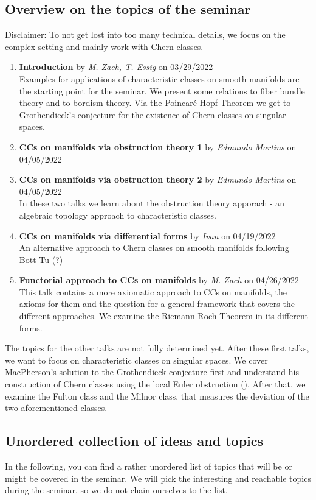 \documentclass[a4paper]{article}
\begin{document}
\subsection*{Overview on the topics of the seminar}
Disclaimer: To not get lost into too many technical details, we focus on the complex setting
and mainly work with Chern classes.

\begin{enumerate}
\item \textbf{Introduction} by \emph{M. Zach, T. Essig} on 03/29/2022 \\
	Examples for applications of characteristic classes on smooth manifolds are the
	starting point for the seminar. We present some relations to fiber bundle theory 
	and to bordism theory. Via the Poincar\'e-Hopf-Theorem we get to Grothendieck's 
	conjecture for the existence of Chern classes on singular spaces.
\item \textbf{CCs on manifolds via obstruction theory 1} by \emph{Edmundo Martins} on 04/05/2022
\item \textbf{CCs on manifolds via obstruction theory 2} by \emph{Edmundo Martins} on 04/05/2022\\
	In these two talks we learn about the obstruction theory apporach - an algebraic 
	topology approach to characteristic classes.
\item \textbf{CCs on manifolds via differential forms} by \emph{Ivan} on 04/19/2022 \\
	An alternative approach to Chern classes on smooth manifolds following Bott-Tu (?)
\item \textbf{Functorial approach to CCs on manifolds} by \emph{M. Zach} on 04/26/2022 \\
	This talk contains a more axiomatic approach to CCs on manifolds, the axioms
	for them and the question for a general framework that covers the different approaches.
	We examine the Riemann-Roch-Theorem in its different forms.
\end{enumerate}
The topics for the other talks are not fully determined yet. After these first talks, we want
to focus on characteristic classes on singular spaces. We cover MacPherson's solution to 
the Grothendieck conjecture first and understand his construction of Chern classes using the
local Euler obstruction (\cite{MacPherson74,Parusinski06}). After that, we examine the Fulton 
class and the Milnor class, that measures the deviation of the two aforementioned classes.

\subsection*{Unordered collection of ideas and topics}
In the following, you can find a rather unordered list of topics that will be or might be
covered in the seminar. We will pick the interesting and reachable topics during the seminar,
so we do not chain ourselves to the list.
\end{document}
